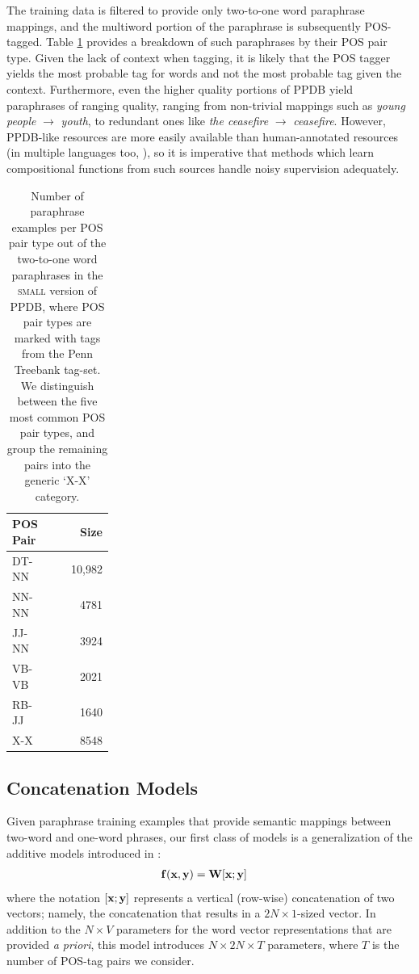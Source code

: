 \documentclass[11pt,letterpaper]{article}
\newcommand{\bX}{{\bf x}}
\newcommand{\bY}{{\bf y}}
\newcommand{\bF}{{\bf f}}
\newcommand{\bW}{{\bf W}}
\begin{document}
The training data is filtered to provide only two-to-one word paraphrase mappings, and the multiword portion of the paraphrase is subsequently POS-tagged.
Table \ref{tab:pos-stats} provides a breakdown of such paraphrases by their POS pair type.  
Given the lack of context when tagging, it is likely that the POS tagger yields the most probable tag for words and not the most probable tag given the context. 
Furthermore, even the higher quality portions of PPDB yield paraphrases of ranging quality, ranging from non-trivial mappings such as \emph{young people} $\rightarrow$ \emph{youth}, to redundant ones like \emph{the ceasefire} $\rightarrow$ \emph{ceasefire}. 
However, PPDB-like resources are more easily available than human-annotated resources (in multiple languages too, ), so it is imperative that methods which learn compositional functions from such sources handle noisy supervision adequately. 

\begin{table}[h!]
  \begin{center}
    \begin{tabular}{p{0.25\linewidth}r}
      \hline
      POS Pair & Size \\
	  \hline
      DT-NN & 10,982 \\
	  NN-NN &  4781 \\
	  JJ-NN & 3924 \\
  	  VB-VB  &  2021 \\
      RB-JJ &  1640 \\
	  X-X  & 8548 \\
	\end{tabular}
  \end{center}
  \caption{Number of paraphrase examples per POS pair type out of the two-to-one word paraphrases in the \textsc{small} version of PPDB, where POS pair types are marked with tags from the Penn Treebank tag-set. We distinguish between the five most common POS pair types, and group the remaining pairs into the generic `X-X' category.}
  \label{tab:pos-stats}
\end{table}

\subsection{Concatenation Models}
\label{sec:concat}

Given paraphrase training examples that provide semantic mappings between two-word and one-word phrases, our first class of models is a generalization of the additive models introduced in :
\begin{align}
	\bF (\bX, \bY) &= \bW [\bX;\bY]
	\label{eq:concat}
\end{align}
where the notation $[\bX; \bY]$ represents a vertical (row-wise) concatenation of two vectors; namely, the concatenation that results in a $2N \times 1$-sized vector.  
In addition to the $N \times V$ parameters for the word vector representations that are provided \emph{a priori}, this model introduces $N \times 2N \times T$ parameters, where $T$ is the number of POS-tag pairs we consider.  
\end{document}
